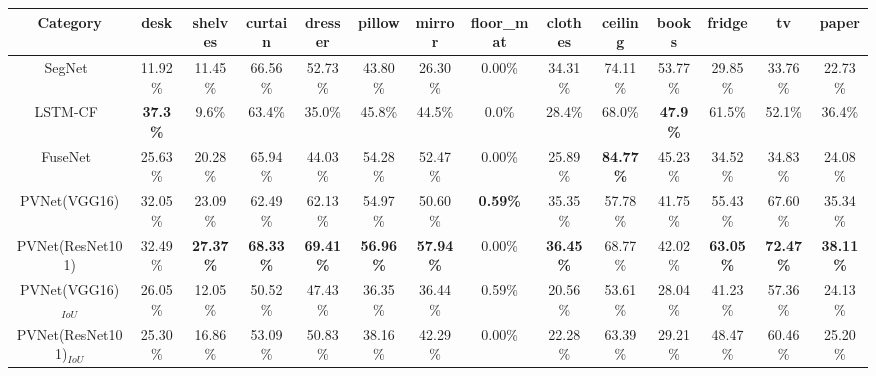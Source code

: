 \documentclass[letterpaper, 10 pt, conference]{ieeeconf}
\begin{document}
\begin{table*}[thpb]
{\begin{tabular}{ c | c  c  c  c  c  c  c  c  c  c  c  c  c}
Category                               & desk & shelves & curtain & dresser & pillow & mirror & floor\_mat & clothes & ceiling & books & fridge & tv & paper\\
\midrule
SegNet~\cite{badrinarayanan2015segnet}  & 11.92\% & 11.45\% & 66.56\% & 52.73\% & 43.80\% & 26.30\% & 0.00\% & 34.31\% & 74.11\% & 53.77\% & 29.85\% & 33.76\% & 22.73\% \\
LSTM-CF~\cite{li2016lstm}               & \textbf{37.3\%}  & 9.6\%   & 63.4\%  & 35.0\%  & 45.8\%  & 44.5\%  & 0.0\%  & 28.4\%  & 68.0\%  & \textbf{47.9\%}  & 61.5\%  & 52.1\%  & 36.4\% \\
FuseNet~\cite{hazirbas2016fusenet}      & 25.63\% & 20.28\% & 65.94\% & 44.03\% & 54.28\% & 52.47\% & 0.00\% & 25.89\% & \textbf{84.77\%} & 45.23\% & 34.52\% & 34.83\% & 24.08\% \\
PVNet(VGG16)                           & 32.05\% & 23.09\% & 62.49\% & 62.13\% & 54.97\% & 50.60\% & \textbf{0.59\%} & 35.35\% & 57.78\% & 41.75\% & 55.43\% & 67.60\% & 35.34\%\\
PVNet(ResNet101)                       & 32.49\% & \textbf{27.37\%} & \textbf{68.33\%} & \textbf{69.41\%} & \textbf{56.96\%} & \textbf{57.94\%} & 0.00\% & \textbf{36.45\%} & 68.77\% & 42.02\% & \textbf{63.05\%} & \textbf{72.47\%} & \textbf{38.11\%}\\
\midrule
PVNet(VGG16)$_{IoU}$                   & 26.05\% & 12.05\% & 50.52\% & 47.43\% & 36.35\% & 36.44\% & 0.59\%  & 20.56\% & 53.61\% & 28.04\% & 41.23\% & 57.36\% & 24.13\%\\
PVNet(ResNet101)$_{IoU}$               & 25.30\% & 16.86\% & 53.09\% & 50.83\% & 38.16\% & 42.29\% & 0.00\%  & 22.28\% & 63.39\% & 29.21\% & 48.47\% & 60.46\% & 25.20\% \\
\toprule


\end{tabular}}
\end{table*}
\end{document}
